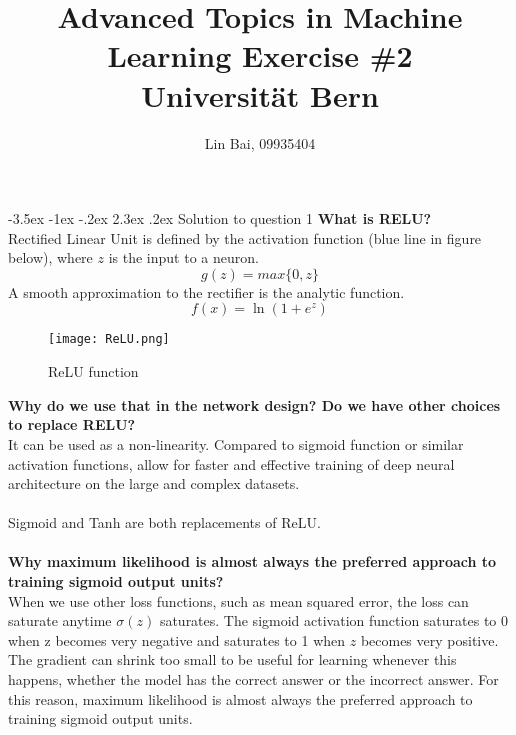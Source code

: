 \documentclass[12pt]{article}
\makeatletter
\renewcommand\section{\@startsection {section}{1}{\z@}%
	{-3.5ex \@plus -1ex \@minus -.2ex}%
	{2.3ex \@plus.2ex}%
	{\normalfont\large\bfseries}}%
\makeatother
\begin{document}
	
	
	
	\title{\textbf{Advanced Topics in Machine Learning Exercise \#{2}}\\
	Universit{\"a}t Bern}%
	\author{{Lin Bai, 09935404}} %
	
	\maketitle

	\section{Solution to question 1}
	\textbf{What is RELU?}\\
	Rectified Linear Unit is defined by the activation function (blue line in figure below), where $z$ is the input to a neuron.\\
	$$g(z) = max\{0,z\}$$
	A smooth approximation to the rectifier is the analytic function.\\
	$$f(x) = \ln(1+e^z)$$

	\begin{figure}[htpb]
		\centering
		\texttt{[image: ReLU.png]}
		\caption{ReLU function}
	\end{figure}
	\noindent
	\textbf{Why do we use that in the network design? Do we have other choices to replace RELU?}\\
	It can be used as a non-linearity. Compared to sigmoid function or similar activation functions, allow for faster and effective training of deep neural architecture on the large and complex datasets.\\
	\\
	Sigmoid and Tanh are both replacements of ReLU.\\
	\\
	\textbf{Why maximum likelihood is almost always the preferred approach to training sigmoid output units?}\\
	When we use other loss functions, such as mean squared error, the loss can
	saturate anytime $\sigma(z)$ saturates. The sigmoid activation function saturates to 0 when z becomes very negative and saturates to 1 when $z$ becomes very positive. The gradient can shrink too small to be useful for learning whenever this happens, whether the model has the correct answer or the incorrect answer. For this reason, maximum likelihood is almost always the preferred approach to training sigmoid output units.
	\\
\end{document}
